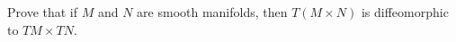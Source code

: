 Prove that if $M$ and $N$ are smooth manifolds, then $T(M \times N)$ is diffeomorphic to $TM \times TN$.